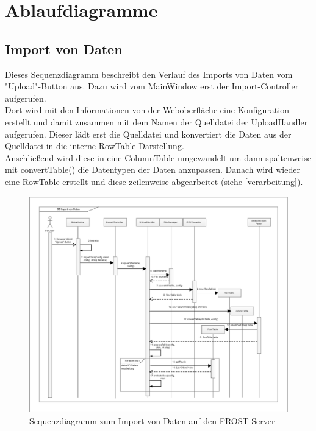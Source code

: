 \section{Ablaufdiagramme}

\subsection{Import von Daten}

Dieses Sequenzdiagramm beschreibt den Verlauf des Imports von Daten vom "{Upload}"{-Button} aus.
Dazu wird vom MainWindow erst der Import-Controller aufgerufen.\\
Dort wird mit den Informationen von der Weboberfläche eine Konfiguration erstellt und damit zusammen mit dem Namen der Quelldatei der UploadHandler aufgerufen.
Dieser lädt erst die Quelldatei und konvertiert die Daten aus der Quelldatei in die interne RowTable-Darstellung.\\
Anschließend wird diese in eine ColumnTable umgewandelt um dann spaltenweise mit convertTable() die Datentypen der Daten anzupassen.
Danach wird wieder eine RowTable erstellt und diese zeilenweise abgearbeitet (siehe \ref{verarbeitung}).
\vspace{\fill}
\begin{figure}[htbp]
\centering
\includegraphics[scale=0.45]{uml/SD_upload.eps}
\caption{Sequenzdiagramm zum Import von Daten auf den FROST-Server}
\end{figure}
\vspace{\fill}

